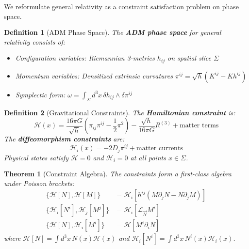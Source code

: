 \documentclass[11pt,a4paper]{article}
\newtheorem{theorem}{Theorem}[section]
\newtheorem{definition}{Definition}[section]
\theoremstyle{remark}
\theoremstyle{definition}
\begin{document}
We reformulate general relativity as a constraint satisfaction problem on phase space.

\begin{definition}[ADM Phase Space]
The \textbf{ADM phase space} for general relativity consists of:
\begin{itemize}
\item Configuration variables: Riemannian 3-metrics $h_{ij}$ on spatial slice $\Sigma$
\item Momentum variables: Densitized extrinsic curvatures $\pi^{ij} = \sqrt{h}(K^{ij} - K h^{ij})$
\item Symplectic form: $\omega = \int_\Sigma d^3x \, \delta h_{ij} \wedge \delta \pi^{ij}$
\end{itemize}
\end{definition}

\begin{definition}[Gravitational Constraints]
The \textbf{Hamiltonian constraint} is:
\begin{equation}
\mathcal{H}(x) = \frac{16\pi G}{\sqrt{h}}\left(\pi_{ij}\pi^{ij} - \frac{1}{2}\pi^2\right) - \frac{\sqrt{h}}{16\pi G}R^{(3)} + \text{matter terms}
\end{equation}
The \textbf{diffeomorphism constraints} are:
\begin{equation}
\mathcal{H}_i(x) = -2 D_j \pi^{ij} + \text{matter currents}
\end{equation}
Physical states satisfy $\mathcal{H} = 0$ and $\mathcal{H}_i = 0$ at all points $x \in \Sigma$.
\end{definition}

\begin{theorem}[Constraint Algebra]
The constraints form a first-class algebra under Poisson brackets:
\begin{align}
\{\mathcal{H}[N], \mathcal{H}[M]\} &= \mathcal{H}_i[h^{ij}(M \partial_j N - N \partial_j M)] \\
\{\mathcal{H}_i[N^i], \mathcal{H}_j[M^j]\} &= \mathcal{H}_i[\mathcal{L}_{\vec{N}} M^i] \\
\{\mathcal{H}[N], \mathcal{H}_i[M^i]\} &= \mathcal{H}[M^i \partial_i N]
\end{align}
where $\mathcal{H}[N] = \int d^3x \, N(x) \mathcal{H}(x)$ and $\mathcal{H}_i[N^i] = \int d^3x \, N^i(x) \mathcal{H}_i(x)$.
\end{theorem}
\end{document}
